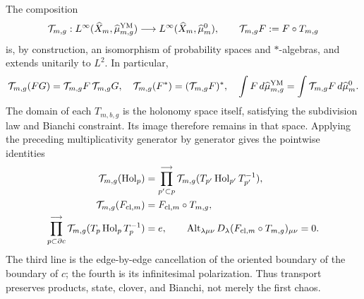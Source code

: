 The composition
\begin{equation}\label{eq:pdf2-ym-full-probability-isomorphism}
 \mathcal T_{m,g}:L^\infty(\widehat X_m,\widehat\mu_{m,g}^{\rm YM})
 \longrightarrow L^\infty(\widehat X_m,\widehat\mu_m^0),
 \qquad \mathcal T_{m,g}F:=F\circ T_{m,g}
\end{equation}
is, by construction, an isomorphism of probability spaces and
$*$-algebras, and extends unitarily to $L^2$. In particular,
\begin{equation}\label{eq:pdf2-ym-full-algebra-identities}
 \mathcal T_{m,g}(FG)=\mathcal T_{m,g}F\,\mathcal T_{m,g}G,
 \quad
 \mathcal T_{m,g}(F^*)=(\mathcal T_{m,g}F)^*,
 \quad
 \int F\,d\widehat\mu_{m,g}^{\rm YM}
 =\int\mathcal T_{m,g}F\,d\widehat\mu_m^0.
\end{equation}
The domain of each $T_{m,b,g}$ is the holonomy space itself, satisfying
the subdivision law and Bianchi constraint. Its image therefore remains
in that space. Applying the preceding multiplicativity generator by generator
gives the pointwise identities
\begin{equation}\label{eq:pdf2-ym-transport-surface-bianchi}
 \begin{aligned}
 \mathcal T_{m,g}(\operatorname{Hol}_p)
 &=\prod_{p'\subset p}^{\longrightarrow}
   \mathcal T_{m,g}(T_{p'}\operatorname{Hol}_{p'}T_{p'}^{-1}),\\
 \mathcal T_{m,g}(F_{{\rm cl},m})
 &=F_{{\rm cl},m}\circ T_{m,g},\\
 \prod_{p\subset\partial c}^{\longrightarrow}
 \mathcal T_{m,g}(T_p\operatorname{Hol}_pT_p^{-1})&=e,
 \qquad
 \operatorname{Alt}_{\lambda\mu\nu}
 D_\lambda(F_{{\rm cl},m}\circ T_{m,g})_{\mu\nu}=0.
 \end{aligned}
\end{equation}
The third line is the edge-by-edge cancellation of the oriented boundary of
the boundary of $c$; the fourth is its infinitesimal polarization. Thus transport
preserves products, state, clover, and Bianchi, not merely the first chaos.

